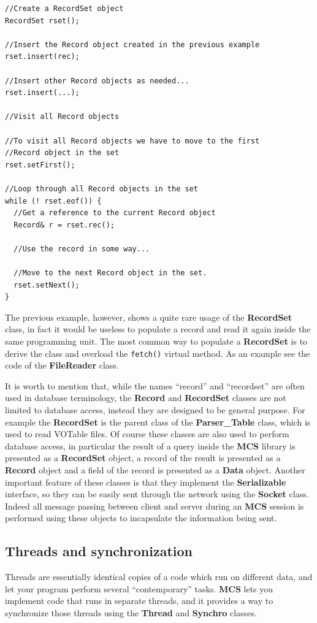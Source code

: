 \documentclass[12pt,titlepage]{article}
\newcommand{\mcs}{\textbf{MCS} }
\begin{document}
\begin{lstlisting}
//Create a RecordSet object
RecordSet rset();

//Insert the Record object created in the previous example
rset.insert(rec);

//Insert other Record objects as needed...
rset.insert(...);

//Visit all Record objects

//To visit all Record objects we have to move to the first
//Record object in the set
rset.setFirst();

//Loop through all Record objects in the set
while (! rset.eof()) {
  //Get a reference to the current Record object
  Record& r = rset.rec();

  //Use the record in some way...

  //Move to the next Record object in the set.
  rset.setNext();
}
\end{lstlisting}

\noindent
The previous example, however, shows a quite rare usage of the
\textbf{RecordSet} class, in fact it would be useless to populate a
record and read it again inside the same programming unit. The most
common way to populate a \textbf{RecordSet} is to derive the class and
overload the \verb|fetch()| virtual method. As an example see the code
of the \textbf{FileReader} class.

\bigskip
It is worth to mention that, while the names ``record'' and
``recordset'' are often used in database terminology, the
\textbf{Record} and \textbf{RecordSet} classes are not limited to
database access, instead they are designed to be general purpose. For
example the \textbf{RecordSet} is the parent class of the
\textbf{Parser\_Table} class, which is used to read VOTable files. Of
course these classes are also used to perform database access, in
particular the result of a query inside the \mcs library is presented
as a \textbf{RecordSet} object, a record of the result is presented as
a \textbf{Record} object and a field of the record is presented as a
\textbf{Data} object. Another important feature of these classes is
that they implement the \textbf{Serializable} interface, so they can
be easily sent through the network using the \textbf{Socket} class.
Indeed all message passing between client and server during an \mcs
session is performed using these objects to incapsulate the
information being sent.

%
\subsection{Threads and synchronization}
\label{sec:Threads and synchronization}
Threads are essentially identical copies of a code which run on
different data, and let your program perform several ``contemporary''
tasks. \mcs lets you implement code that runs in separate threads, and
it provides a way to synchronize those threads using the \textbf{Thread}
and \textbf{Synchro} classes.
\end{document}
